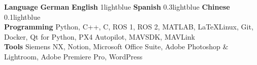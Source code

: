 \vspace{4mm} 

\begin{cvskills}
  \skill
    {\textbf{Language}}
    {\textbf{German} {} \textbf{English} { {1}{lightblue}} \textbf{Spanish} { {0.3}{lightblue}} \textbf{Chinese} { {0.1}{lightblue}}} %
    \\
  \skill
    {\textbf{Programming}}
    {Python, C++, C, ROS 1, ROS 2, MATLAB, LaTeX\linebreak Linux, Git, Docker, Qt for Python, PX4 Autopilot, MAVSDK, MAVLink}
    \\
    \skill
    {\textbf{Tools}}
    {Siemens NX, Notion, Microsoft Office Suite, Adobe Photoshop \& Lightroom, Adobe Premiere Pro, WordPress}
    \\
\end{cvskills}
